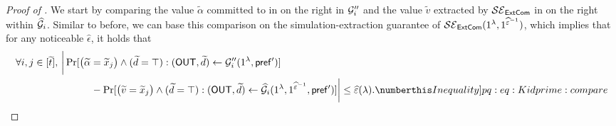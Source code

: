 \begin{proof}[Proof of ]
    We start by comparing the value $\tilde{\alpha}$ committed to in  on the right in $\mathcal{G}_i''$ and the value $\tilde{v}$ extracted by $\mathcal{SE}_\mathsf{ExtCom}$ in  on the right within $\mathcal{\widehat{G}}_i$. Similar to before, we can base this comparison on the simulation-extraction guarantee of $\mathcal{SE}_\mathsf{ExtCom}(1^\lambda, 1^{\widehat{\varepsilon}^{-1}})$, which implies that for any noticeable $\hat{\epsilon}$, it holds that
    \begin{align*}
        \forall i,j \in [\tilde{t}],~ & \bigg| \Pr[\big( \tilde{\alpha} = \tilde{x}_j \big)\wedge (\tilde{d} = \top): (\OUT,\tilde{d}) \gets \mcal{G}_i''(1^\secpar, \msf{pref'})] \\
         & \hspace{3em} - 
         \Pr[\big( \tilde{v} = \tilde{x}_j \big)\wedge (\tilde{d} = \top): (\OUT, \tilde{d}) \gets \mcal{\hat{G}}_i(1^\secpar, 1^{\hat{\epsilon}^{-1}}, \msf{pref'})] \bigg| 
         \leq \hat{\epsilon}(\secpar). \numberthis \label[Inequality]{pq:eq:Kidprime:compare}
    \end{align*} 


\end{proof}

